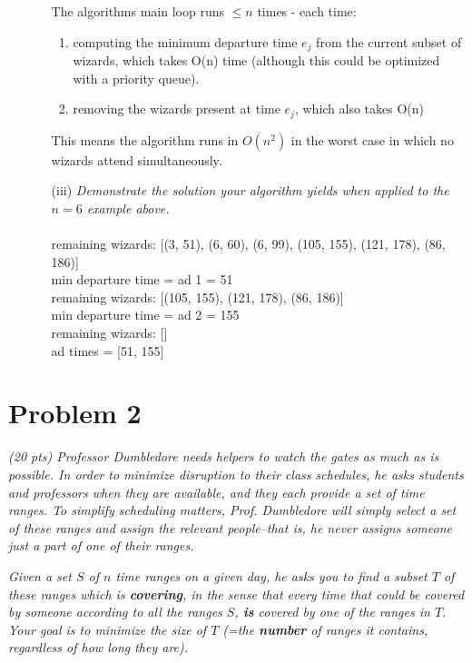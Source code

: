 \documentclass[12pt]{article}
\begin{document}
\begin{enumerate}
\begin{enumerate}
  The algorithms main loop runs $\le n$ times - each time:
  \begin{enumerate} 
    \item computing the minimum departure time $e_j$ from the current subset of wizards, which takes O(n) time (although this could be optimized with a priority queue). 
    \item removing the wizards present at time $e_j$, which also takes O(n) 
  \end{enumerate}


  This means the algorithm runs in $O(n^2)$ in the worst case in which no wizards attend simultaneously.  

  \item[(iii)] \textit{Demonstrate the solution your algorithm yields when applied to the $n = 6$
example above.}
 \\\\
 remaining wizards:  [(3, 51), (6, 60), (6, 99), (105, 155), (121, 178), (86, 186)] \\
min departure time = ad 1 =  51 \\
remaining wizards:  [(105, 155), (121, 178), (86, 186)] \\
min departure time = ad 2 =  155 \\
remaining wizards: [] \\
ad times = [51, 155]
  \end{enumerate}

\end{enumerate}

\newpage

\section*{Problem 2}

\textit{(20 pts) Professor Dumbledore needs helpers to watch the gates as much as is possible.
In order to minimize disruption to their class schedules, he asks students and professors
when they are available, and they each provide a set of time ranges. To simplify
scheduling matters, Prof. Dumbledore will simply select a set of these ranges and
assign the relevant people--that is, he never assigns someone just a part of one of their
ranges.}

\textit{Given a set $S$ of $n$ time ranges on a given day, he asks you to find a subset $T$ of these
ranges which is \textbf{covering}, in the sense that every time that could be covered by someone
according to all the ranges $S$, \textbf{is} covered by one of the ranges in $T$. Your goal is to
minimize the size of $T$ (=the \textbf{number} of ranges it contains, regardless of how long they
are).}
\end{document}
